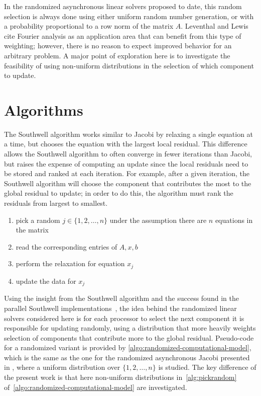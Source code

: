 \documentclass{article}
\theoremstyle{definition}
\theoremstyle{example}
\theoremstyle{example}
\theoremstyle{example}
\begin{document}
In the randomized asynchronous linear solvers proposed to date, this random selection is always done using either uniform random number generation, or with a probability proportional to a row norm of the matrix $A$. Leventhal and Lewis cite Fourier analysis \cite{leventhal2010randomized} as an application area that can benefit from this type of weighting; however, there is no reason to expect improved behavior for an arbitrary problem. A major point of exploration here is to investigate the feasibility of using non-uniform distributions in the selection of which component to update.


\section{Algorithms}
\label{sect:algorithms}

The Southwell algorithm \cite{southwell1946relaxation} works similar to Jacobi by relaxing a single equation at a time, but chooses the equation with the largest local residual. This difference allows the Southwell algorithm to often converge in fewer iterations than Jacobi, but raises the expense of computing an update since the local residuals need to be stored and ranked at each iteration. For example, after a given iteration, the Southwell algorithm will choose the component that contributes the most to the global residual to update; in order to do this, the algorithm must rank the residuals from largest to smallest.

\begin{enumerate}
	\item pick a random $j \in \{1, 2, \ldots, n\}$ under the assumption there are $n$ equations in the matrix
	\item read the corresponding entries of $A, x, b$
	\item perform the relaxation for equation $x_j$
	\item update the data for $x_j$
\end{enumerate}

Using the insight from the Southwell algorithm and the success found in the parallel Southwell implementations~\cite{wolfson2016reducing,wolfson2017distributed}, the idea behind the randomized linear solvers considered here is for each processor to select the next component it is responsible for updating randomly, using a distribution that more heavily weights selection of components that contribute more to the global residual.  Pseudo-code for a randomized variant is provided by \cref{algo:randomized-computational-model}, which is the same as the one for the randomized asynchronous Jacobi presented in \cite{avron2015revisiting}, where a  uniform distribution over $\{1, 2, \ldots, n\}$ is studied. The key difference of the present work is that here non-uniform distributions  in~\cref{alg:pickrandom} of~\cref{algo:randomized-computational-model} are investigated. 
\end{document}

